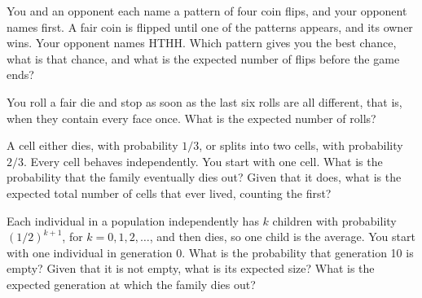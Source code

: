 \begin{question}\label{iq:iv1:waiting-times-and-markov-chains:22}
You and an opponent each name a pattern of four coin flips, and your opponent names first. A fair coin is flipped until one of the patterns appears, and its owner wins. Your opponent names HTHH. Which pattern gives you the best chance, what is that chance, and what is the expected number of flips before the game ends?
\end{question}

\begin{question}\label{iq:iv1:waiting-times-and-markov-chains:23}
You roll a fair die and stop as soon as the last six rolls are all different, that is, when they contain every face once. What is the expected number of rolls?
\end{question}

\begin{question}\label{iq:iv1:waiting-times-and-markov-chains:24}
A cell either dies, with probability $1/3$, or splits into two cells, with probability $2/3$. Every cell behaves independently. You start with one cell. What is the probability that the family eventually dies out? Given that it does, what is the expected total number of cells that ever lived, counting the first?
\end{question}

\begin{question}\label{iq:iv1:waiting-times-and-markov-chains:25}
Each individual in a population independently has $k$ children with probability $(1/2)^{k+1}$, for $k = 0, 1, 2, \dots$, and then dies, so one child is the average. You start with one individual in generation 0. What is the probability that generation 10 is empty? Given that it is not empty, what is its expected size? What is the expected generation at which the family dies out?
\end{question}
